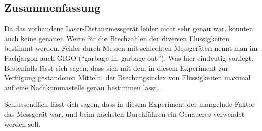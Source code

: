 \documentclass[11pt,ngerman]{scrartcl}
\begin{document}
\subsection{Zusammenfassung}
Da das vorhandene Laser-Distanzmessgerät leider nicht sehr genau
war, konnten auch keine genauen Werte für die Brechzahlen der 
diversen Flüssigkeiten bestimmt werden. Fehler durch Messen mit schlechten
Messgeräten nennt man im Fachjargon auch GIGO (``garbage in, garbage out'').
Was hier eindeutig vorliegt. Bestenfalls lässt sich sagen, dass sich mit den,
in diesem Experiment zur Verfügung gestandenen Mitteln, der Brechungsindex 
von Flüssigkeiten maximal auf eine Nachkommastelle genau bestimmen lässt.

Schlussendlich lässt sich sagen, dass in diesem Experiment der mangelnde Faktor
das Messgerät war, und beim nächsten Durchführen ein Genaueres verwendet werden soll.

\newpage
\printbibliography

\listoffigures

\listoftables
\end{document}
